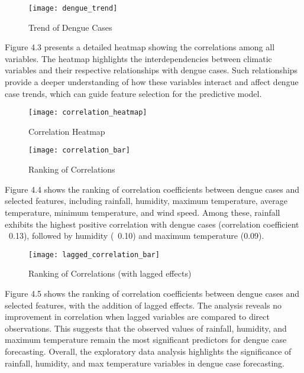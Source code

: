 \begin{figure}[ht]
	\centering
	\texttt{[image: dengue\_trend]}
	\caption{Trend of Dengue Cases}
	\label{fig:data_trend}
\end{figure}

Figure 4.3 presents a detailed heatmap showing the correlations among all variables. The heatmap highlights the interdependencies between climatic variables and their respective relationships with dengue cases. Such relationships provide a deeper understanding of how these variables interact and affect dengue case trends, which can guide feature selection for the predictive model.

\begin{figure}[H]
	\centering
	\texttt{[image: correlation\_heatmap]}
	\caption{Correlation Heatmap}
	\label{fig:correlation_heatmap}
\end{figure}

\begin{figure}[ht]
	\centering
	\texttt{[image: correlation\_bar]}
	\caption{Ranking of Correlations}
	\label{fig:correlation_bar}
\end{figure}

Figure 4.4 shows the ranking of correlation coefficients between dengue cases and selected features, including rainfall, humidity, maximum temperature, average temperature, minimum temperature, and wind speed. Among these, rainfall exhibits the highest positive correlation with dengue cases (correlation coefficient ~0.13), followed by humidity (~0.10) and maximum temperature (0.09). 

\begin{figure}[ht]
	\centering
	\texttt{[image: lagged\_correlation\_bar]}
	\caption{Ranking of Correlations (with lagged effects)}
	\label{fig:lagged_correlation_bar}
\end{figure}

Figure 4.5 shows the ranking of correlation coefficients between dengue cases and selected features, with the addition of lagged effects. The analysis reveals no improvement in correlation when lagged variables are compared to direct observations. This suggests that the observed values of rainfall, humidity, and maximum temperature remain the most significant predictors for dengue case forecasting. Overall, the exploratory data analysis highlights the significance of rainfall, humidity, and max temperature variables in dengue case forecasting.



